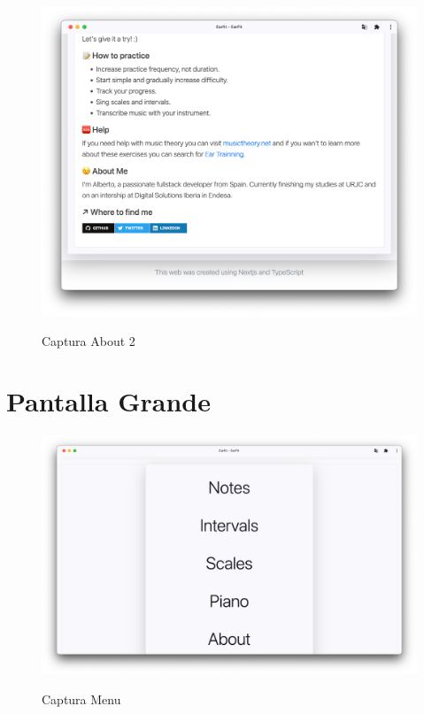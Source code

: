\documentclass[12pt,twoside,titlepage]{report}
\begin{document}
\begin{figure}[H]
    \centering
    \includegraphics[scale=0.3]{Capturas Earfit/Tablet/About2}
    \label{fig:TabletAbout2}
    \caption{Captura About 2}
\end{figure}

\section{Pantalla Grande}

\begin{figure}[H]
    \centering
    \includegraphics[scale=0.28]{Capturas Earfit/PC/Menu}
    \label{fig:PCMenu}
    \caption{Captura Menu}
\end{figure}
\end{document}
